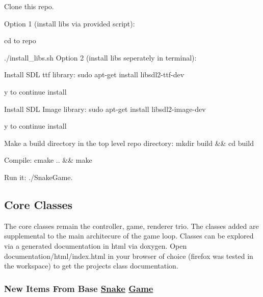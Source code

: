 \begin{DoxyEnumerate}
\item Clone this repo.
\item Option 1 (install libs via provided script)\+:
\begin{DoxyEnumerate}
\item cd to repo
\item {\ttfamily ./install\+\_\+libs.sh} Option 2 (install libs seperately in terminal)\+:
\end{DoxyEnumerate}
\begin{DoxyEnumerate}
\item Install S\+DL ttf library\+: {\ttfamily sudo apt-\/get install libsdl2-\/ttf-\/dev}
\begin{DoxyItemize}
\item {\ttfamily y} to continue install
\end{DoxyItemize}
\item Install S\+DL Image library\+: {\ttfamily sudo apt-\/get install libsdl2-\/image-\/dev}
\begin{DoxyItemize}
\item {\ttfamily y} to continue install
\end{DoxyItemize}
\end{DoxyEnumerate}
\item Make a build directory in the top level repo directory\+: {\ttfamily mkdir build \&\& cd build}
\item Compile\+: {\ttfamily cmake .. \&\& make}
\item Run it\+: {\ttfamily ./\+Snake\+Game}.
\end{DoxyEnumerate}

\subsection*{Core Classes}

The core classes remain the controller, game, renderer trio. The classes added are supplemental to the main architecure of the game loop. Classes can be explored via a generated documentation in html via doxygen. Open documentation/html/index.\+html in your browser of choice (firefox was tested in the workspace) to get the project\textquotesingle{}s class documentation.

\subsubsection*{New Items From Base \hyperlink{classSnake}{Snake} \hyperlink{classGame}{Game}}


